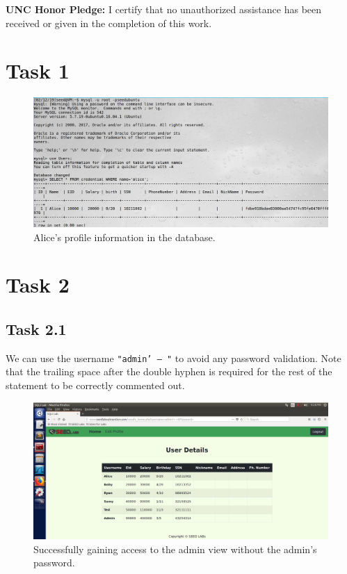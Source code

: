 \documentclass[12pt,letterpaper]{article}
\author{Chathan Driehuys}
\begin{document}
	\noindent \textbf{UNC Honor Pledge:} I certify that no unauthorized assistance has been received or given in the completion of this work.
	
	\vspace{.5in}
	
	\section*{Task 1}
		\begin{figure}[h!]
			\includegraphics[width=\linewidth]{task-1-alice}
			\caption{Alice's profile information in the database.}
		\end{figure}
	
	\section*{Task 2}
		\subsection*{Task 2.1}
			We can use the username \texttt{"admin' -- "} to avoid any password validation. Note that the trailing space after the double hyphen is required for the rest of the statement to be correctly commented out.
		
			\begin{figure}[h!]
				\includegraphics[width=\linewidth]{task-2-1-admin}
				\caption{Successfully gaining access to the admin view without the admin's password.}
			\end{figure}
		
\end{document}
